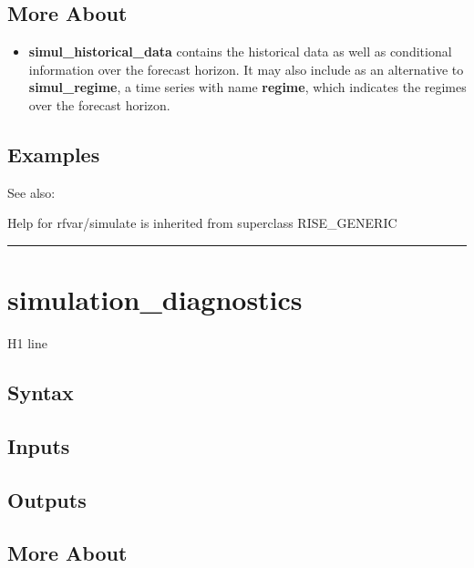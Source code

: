 \documentclass[letterpaper,10pt,english]{sphinxmanual}
\begin{document}
\subsection{More About}
\label{classes/models/@rfvar/rfvar:id126}\begin{itemize}
\item {} 
\textbf{simul\_historical\_data} contains the historical data as well as
conditional information over the forecast horizon. It may also include
as an alternative to \textbf{simul\_regime}, a time series with name
\textbf{regime}, which indicates the regimes over the forecast horizon.

\end{itemize}


\subsection{Examples}
\label{classes/models/@rfvar/rfvar:id127}
See also:

Help for rfvar/simulate is inherited from superclass RISE\_GENERIC


\bigskip\hrule{}\bigskip



\section{simulation\_diagnostics}
\label{classes/models/@rfvar/rfvar:simulation-diagnostics}\label{classes/models/@rfvar/rfvar:id128}
H1 line


\subsection{Syntax}
\label{classes/models/@rfvar/rfvar:id129}

\subsection{Inputs}
\label{classes/models/@rfvar/rfvar:id130}

\subsection{Outputs}
\label{classes/models/@rfvar/rfvar:id131}

\subsection{More About}
\label{classes/models/@rfvar/rfvar:id132}
\end{document}
